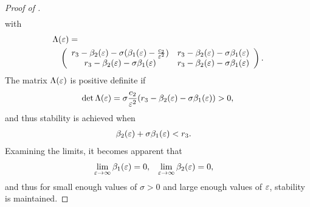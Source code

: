 \documentclass[twocolumn]{article}
\begin{document}
\begin{proof} [Proof of ]
\begin{align}
  \end{align}
  with
  \begin{align}
    \lefteqn{\Le =}\\
    \nonumber
    &&\left(\begin{array}{c c}
      r_{3} - \bepstwo - \sigma (\bepsone - \frac{c_{2}}{\resclfparam^{2}}) & r_{3} - \bepstwo - \sigma \bepsone\\
      r_{3} - \bepstwo - \sigma \bepsone & r_{3} - \bepstwo - \sigma \bepsone
    \end{array}\right).
  \end{align}
  The matrix $\Lambda(\varepsilon)$ is positive definite if
  \begin{align}
    \det \Lambda(\varepsilon) = \sigma\frac{c_{2}}{\varepsilon^{2}} (r_{3} - \beta_{2}(\varepsilon) - \sigma \beta_{1}(\varepsilon)) > 0,
  \end{align}
  and thus stability is achieved when
  \begin{align}
    &\beta_{2}(\varepsilon) + \sigma \beta_{1}(\varepsilon) < r_{3}.
  \end{align}
  Examining the limits, it becomes apparent that
  \begin{align}
    \nonumber
    \lim_{\varepsilon \to \infty} \beta_{1}(\varepsilon) = 0, &&\lim_{\varepsilon \to \infty} \beta_{2}(\varepsilon) &= 0,
  \end{align}
  and thus for small enough values of $\sigma > 0$ and large enough values of $\varepsilon$, stability is maintained. \qedhere
\end{proof}
\end{document}
